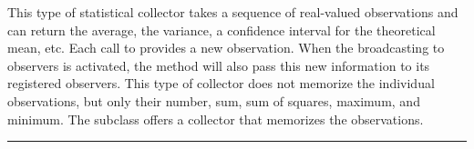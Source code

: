 
This type of statistical collector takes a sequence of real-valued
observations and can return the average,
the variance, a confidence interval for the theoretical mean, etc.
Each call to  provides a new observation.
When the broadcasting to observers is activated,
the method  will also pass this new information to its
registered observers.
This type of collector does not memorize the individual observations,
but only their number, sum, sum of squares, maximum, and minimum.
The subclass  offers a collector that memorizes
the observations.

\bigskip\hrule

